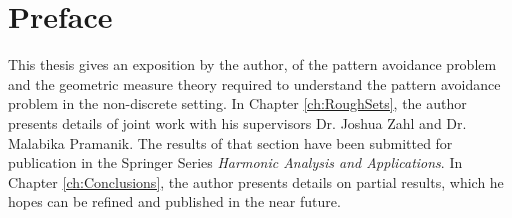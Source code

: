 
\chapter{Preface}

This thesis gives an exposition by the author, of the pattern avoidance problem and the geometric measure theory required to understand the pattern avoidance problem in the non-discrete setting. In Chapter \ref{ch:RoughSets}, the author presents details of joint work with his supervisors Dr. Joshua Zahl and Dr. Malabika Pramanik. The results of that section have been submitted for publication in the Springer Series \emph{Harmonic Analysis and Applications}. In Chapter \ref{ch:Conclusions}, the author presents details on partial results, which he hopes can be refined and published in the near future.